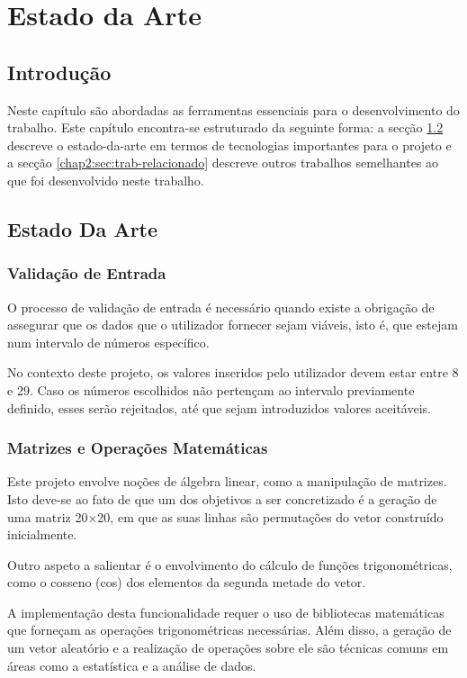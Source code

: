 \chapter{Estado da Arte}
\label{chap:estado-da-arte}

\section{Introdução}
\label{chap2:sec:intro}
Neste capítulo são abordadas as ferramentas essenciais para o desenvolvimento do trabalho. Este capítulo encontra-se estruturado da seguinte forma: a secção \ref{chap2:sec:estado} descreve o estado-da-arte em termos de tecnologias importantes para o projeto e a secção \ref{chap2:sec:trab-relacionado} descreve outros trabalhos semelhantes ao que foi desenvolvido neste trabalho.

\section{Estado Da Arte}
\label{chap2:sec:estado}

\subsection{Validação de Entrada}
\label{chap2:subsec:validacao-entrada}

O processo de validação de entrada é necessário quando existe a obrigação de assegurar que os dados que o utilizador fornecer sejam viáveis, isto é, que estejam num intervalo de números específico. 
\par No contexto deste projeto, os valores inseridos pelo utilizador devem estar entre 8 e 29. Caso os números escolhidos não pertençam ao intervalo previamente definido, esses serão rejeitados, até que sejam introduzidos valores aceitáveis.

\newpage

\subsection{Matrizes e Operações Matemáticas}
\label{chap2:subsec:matrizes-operacoes}
Este projeto envolve noções de álgebra linear, como a manipulação de matrizes.
Isto deve-se ao fato de que um dos objetivos a ser concretizado é a geração de uma matriz 20×20, em que as suas linhas são permutações do vetor construído inicialmente. \par
Outro aspeto a salientar é o envolvimento do cálculo de funções trigonométricas, como o cosseno (cos) dos elementos da segunda metade do vetor. \par
A implementação desta funcionalidade requer o uso de bibliotecas matemáticas que forneçam as operações trigonométricas necessárias. 
Além disso, a geração de um vetor aleatório e a realização de operações sobre ele são técnicas comuns em áreas como a estatística e a análise de dados.

